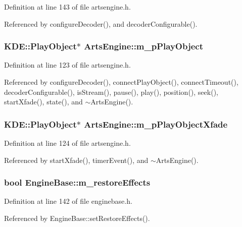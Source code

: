 Definition at line 143 of file artsengine.h.

Referenced by configure\-Decoder(), and decoder\-Configurable().
\subsubsection{\setlength{\rightskip}{0pt plus 5cm}KDE::Play\-Object$\ast$ {\bf Arts\-Engine::m\_\-p\-Play\-Object}\hspace{0.3cm}{\tt  [private]}}\label{classArtsEngine_ArtsEnginer1}




Definition at line 123 of file artsengine.h.

Referenced by configure\-Decoder(), connect\-Play\-Object(), connect\-Timeout(), decoder\-Configurable(), is\-Stream(), pause(), play(), position(), seek(), start\-Xfade(), state(), and $\sim$Arts\-Engine().
\subsubsection{\setlength{\rightskip}{0pt plus 5cm}KDE::Play\-Object$\ast$ {\bf Arts\-Engine::m\_\-p\-Play\-Object\-Xfade}\hspace{0.3cm}{\tt  [private]}}\label{classArtsEngine_ArtsEnginer2}




Definition at line 124 of file artsengine.h.

Referenced by start\-Xfade(), timer\-Event(), and $\sim$Arts\-Engine().
\subsubsection{\setlength{\rightskip}{0pt plus 5cm}bool {\bf Engine\-Base::m\_\-restore\-Effects}\hspace{0.3cm}{\tt  [protected, inherited]}}\label{classEngineBase_EngineBasep3}




Definition at line 142 of file enginebase.h.

Referenced by Engine\-Base::set\-Restore\-Effects().

